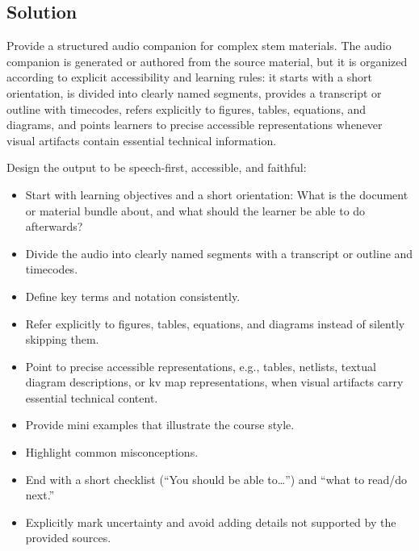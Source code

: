 \subsection*{Solution}

\begin{sol}
Provide a structured audio companion for complex \ac{stem} materials. The audio companion is generated or authored from the source material, but it is organized according to explicit accessibility and learning rules: it starts with a short orientation, is divided into clearly named segments, provides a transcript or outline with timecodes, refers explicitly to figures, tables, equations, and diagrams, and points learners to precise accessible representations whenever visual artifacts contain essential technical information.
\end{sol}

Design the output to be speech-first, accessible, and faithful:
\begin{itemize}
    \item Start with learning objectives and a short orientation: What is the document or material bundle about, and what should the learner be able to do afterwards?
    \item Divide the audio into clearly named segments with a transcript or outline and timecodes.
    \item Define key terms and notation consistently.
    \item Refer explicitly to figures, tables, equations, and diagrams instead of silently skipping them.
    \item Point to precise accessible representations, e.g., tables, netlists, textual diagram descriptions, or \ac{kv} map representations, when visual artifacts carry essential technical content.
    \item Provide mini examples that illustrate the course style.
    \item Highlight common misconceptions.
    \item End with a short checklist (``You should be able to\ldots'') and ``what to read/do next.''
    \item Explicitly mark uncertainty and avoid adding details not supported by the provided sources.
\end{itemize}

